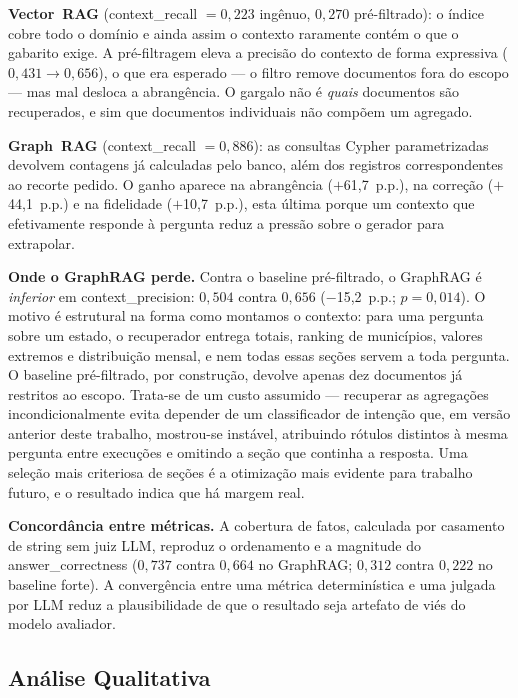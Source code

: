 \documentclass[conference]{IEEEtran}
\begin{document}
\textbf{Vector~RAG} (context\_recall $=0{,}223$ ingênuo, $0{,}270$ pré-filtrado):
o índice cobre todo o domínio e ainda assim o contexto raramente contém o que o
gabarito exige. A pré-filtragem eleva a precisão do contexto de forma expressiva
($0{,}431 \rightarrow 0{,}656$), o que era esperado --- o filtro remove
documentos fora do escopo --- mas mal desloca a abrangência. O gargalo não é
\emph{quais} documentos são recuperados, e sim que documentos individuais não
compõem um agregado.

\textbf{Graph~RAG} (context\_recall $=0{,}886$): as consultas Cypher
parametrizadas devolvem contagens já calculadas pelo banco, além dos registros
correspondentes ao recorte pedido. O ganho aparece na abrangência
($+$61,7~p.p.), na correção ($+$44,1~p.p.) e na fidelidade ($+$10,7~p.p.), esta
última porque um contexto que efetivamente responde à pergunta reduz a pressão
sobre o gerador para extrapolar.

\textbf{Onde o GraphRAG perde.} Contra o baseline pré-filtrado, o GraphRAG é
\emph{inferior} em context\_precision: $0{,}504$ contra $0{,}656$
($-$15,2~p.p.; $p=0{,}014$). O motivo é estrutural na forma como montamos o
contexto: para uma pergunta sobre um estado, o recuperador entrega totais,
ranking de municípios, valores extremos e distribuição mensal, e nem todas essas
seções servem a toda pergunta. O baseline pré-filtrado, por construção, devolve
apenas dez documentos já restritos ao escopo. Trata-se de um custo assumido ---
recuperar as agregações incondicionalmente evita depender de um classificador de
intenção que, em versão anterior deste trabalho, mostrou-se instável, atribuindo
rótulos distintos à mesma pergunta entre execuções e omitindo a seção que
continha a resposta. Uma seleção mais criteriosa de seções é a otimização mais
evidente para trabalho futuro, e o resultado indica que há margem real.

\textbf{Concordância entre métricas.} A cobertura de fatos, calculada por
casamento de string sem juiz LLM, reproduz o ordenamento e a magnitude do
answer\_correctness ($0{,}737$ contra $0{,}664$ no GraphRAG; $0{,}312$ contra
$0{,}222$ no baseline forte). A convergência entre uma métrica determinística e
uma julgada por LLM reduz a plausibilidade de que o resultado seja artefato de
viés do modelo avaliador.

\subsection{Análise Qualitativa}
\end{document}
